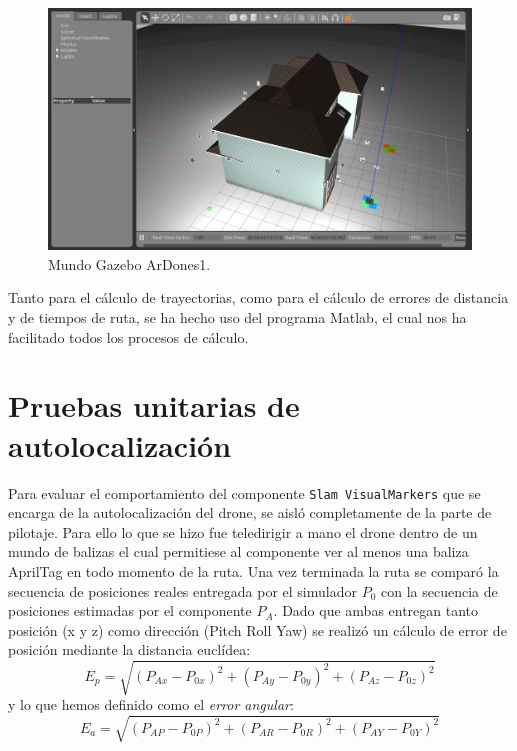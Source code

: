 \begin{figure}[H]
	\begin{center}
		\includegraphics[width=1\textwidth]{imag/IMG28.png}
				\caption{Mundo Gazebo ArDones1.}
		\label{fig:Mundo Gazebo.}	
	\end{center}
\end{figure}

\hspace{1cm} Tanto para el cálculo de trayectorias, como para el cálculo de errores de distancia y de tiempos de ruta, se ha hecho uso del programa Matlab, el cual nos ha facilitado todos los procesos de cálculo.

\section{Pruebas unitarias de autolocalización}
\hspace{1cm} Para evaluar el comportamiento del componente \texttt{Slam VisualMarkers} que se encarga de la autolocalización del drone, se aisló completamente de la parte de pilotaje. Para ello lo que se hizo fue teledirigir a mano el drone dentro de un mundo de balizas el cual permitiese al componente ver al menos una baliza AprilTag en todo momento de la ruta. Una vez terminada la ruta se comparó la secuencia de posiciones reales entregada por el simulador $P_{0}$ con la secuencia de posiciones estimadas por el componente $P_{A} $. Dado que ambas entregan tanto posición (x y z) como dirección (Pitch Roll Yaw) se realizó un cálculo de error de posición mediante la distancia euclídea: 
\[ E_{p} = \sqrt{(P_{Ax}-P_{0x})^{2}+(P_{Ay}-P_{0y})^{2}+(P_{Az}-P_{0z})^{2}}\]
y lo que hemos definido como el \textit{error angular}:    
\[ E_{a} = \sqrt{(P_{AP}-P_{0P})^{2}+(P_{AR}-P_{0R})^{2}+(P_{AY}-P_{0Y})^{2}}\]

